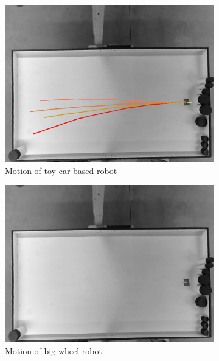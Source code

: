 \begin{figure}[h]
	\centering
	\begin{subfigure}[t]{0.47\textwidth}
		\includegraphics[width=\textwidth]{../hardwareX_paper/robot_17.png}
		\caption{Motion of toy car based robot\label{fig:car_motion}}
	\end{subfigure}
	\begin{subfigure}[t]{0.47\textwidth}
		\includegraphics[width=\textwidth]{../hardwareX_paper/robot_1.png}
		\caption{Motion of big wheel robot\label{fig:big_wheel_motion}}
	\end{subfigure}
	\caption{} %
\end{figure}

